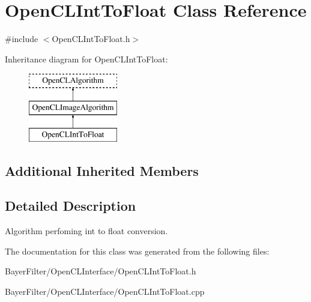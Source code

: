 \hypertarget{class_open_c_l_int_to_float}{\section{Open\-C\-L\-Int\-To\-Float Class Reference}
\label{class_open_c_l_int_to_float}
}


{\ttfamily \#include $<$Open\-C\-L\-Int\-To\-Float.\-h$>$}

Inheritance diagram for Open\-C\-L\-Int\-To\-Float\-:\begin{figure}[H]
\begin{center}
\leavevmode
\includegraphics[height=3.000000cm]{class_open_c_l_int_to_float}
\end{center}
\end{figure}
\subsection*{Additional Inherited Members}


\subsection{Detailed Description}
Algorithm perfoming int to float conversion. 

The documentation for this class was generated from the following files\-:\begin{DoxyCompactItemize}
\item 
Bayer\-Filter/\-Open\-C\-L\-Interface/Open\-C\-L\-Int\-To\-Float.\-h\item 
Bayer\-Filter/\-Open\-C\-L\-Interface/Open\-C\-L\-Int\-To\-Float.\-cpp\end{DoxyCompactItemize}
